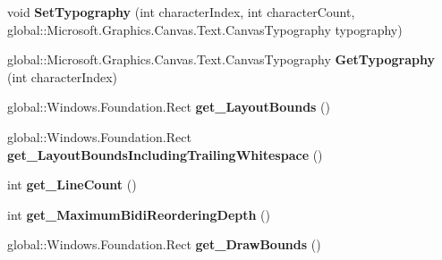 \begin{DoxyCompactItemize}
\item 
\mbox{\label{class_microsoft_1_1_graphics_1_1_canvas_1_1_text_1_1_canvas_text_layout_aae0bff9344ddf4205aab37ecf0fdb8f4}} 
void {\bfseries Set\+Typography} (int character\+Index, int character\+Count, global\+::\+Microsoft.\+Graphics.\+Canvas.\+Text.\+Canvas\+Typography typography)
\item 
\mbox{\label{class_microsoft_1_1_graphics_1_1_canvas_1_1_text_1_1_canvas_text_layout_aa9de23a3678c4be132aa53e6409d9777}} 
global\+::\+Microsoft.\+Graphics.\+Canvas.\+Text.\+Canvas\+Typography {\bfseries Get\+Typography} (int character\+Index)
\item 
\mbox{\label{class_microsoft_1_1_graphics_1_1_canvas_1_1_text_1_1_canvas_text_layout_a772111b2573293b7d5a75e8d2396d598}} 
global\+::\+Windows.\+Foundation.\+Rect {\bfseries get\+\_\+\+Layout\+Bounds} ()
\item 
\mbox{\label{class_microsoft_1_1_graphics_1_1_canvas_1_1_text_1_1_canvas_text_layout_abce87ca208bfa0993ebbf52d11a81671}} 
global\+::\+Windows.\+Foundation.\+Rect {\bfseries get\+\_\+\+Layout\+Bounds\+Including\+Trailing\+Whitespace} ()
\item 
\mbox{\label{class_microsoft_1_1_graphics_1_1_canvas_1_1_text_1_1_canvas_text_layout_ada71c45dac02cdac6f56799104455aa5}} 
int {\bfseries get\+\_\+\+Line\+Count} ()
\item 
\mbox{\label{class_microsoft_1_1_graphics_1_1_canvas_1_1_text_1_1_canvas_text_layout_aac362a9384d9d8fa5cf235e2f129c939}} 
int {\bfseries get\+\_\+\+Maximum\+Bidi\+Reordering\+Depth} ()
\item 
\mbox{\label{class_microsoft_1_1_graphics_1_1_canvas_1_1_text_1_1_canvas_text_layout_a5230b0750a39afe10eab8898a0e65f82}} 
global\+::\+Windows.\+Foundation.\+Rect {\bfseries get\+\_\+\+Draw\+Bounds} ()

\end{DoxyCompactItemize}
